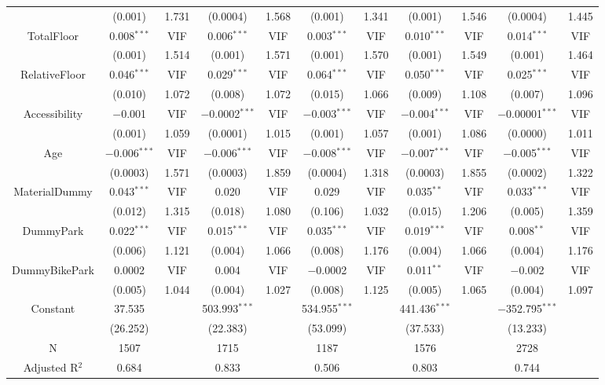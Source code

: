 \documentclass[a4paper, 12pt]{article} %
\begin{document}
\begin{landscape}
\begin{longtable}[c]{ccccccccccc}
& (0.001) & 1.731 & (0.0004) & 1.568 & (0.001) & 1.341 &  (0.001) & 1.546 & (0.0004) & 1.445 \\
\addlinespace[0.5em]
TotalFloor & 0.008$^{***}$ & VIF & 0.006$^{***}$ & VIF & 0.003$^{***}$ & VIF & 0.010$^{***}$ & VIF & 0.014$^{***}$ & VIF \\
& (0.001) & 1.514 & (0.001) & 1.571 & (0.001) & 1.570 & (0.001) & 1.549 & (0.001) & 1.464 \\
\addlinespace[0.5em]
RelativeFloor & 0.046$^{***}$ & VIF & 0.029$^{***}$ & VIF & 0.064$^{***}$ & VIF & 0.050$^{***}$ & VIF & 0.025$^{***}$ & VIF \\
& (0.010) & 1.072 & (0.008) & 1.072 & (0.015) & 1.066 & (0.009) & 1.108 & (0.007) & 1.096 \\
\addlinespace[0.5em]
Accessibility & $-$0.001 & VIF & $-$0.0002$^{***}$ & VIF & $-$0.003$^{***}$ & VIF & $-$0.004$^{***}$ & VIF & $-$0.00001$^{***}$ & VIF \\
& (0.001) & 1.059 & (0.0001) & 1.015 & (0.001) & 1.057 & (0.001) & 1.086 & (0.0000) & 1.011 \\
\addlinespace[0.5em]
Age & $-$0.006$^{***}$ & VIF & $-$0.006$^{***}$ & VIF & $-$0.008$^{***}$ & VIF & $-$0.007$^{***}$ & VIF & $-$0.005$^{***}$ & VIF \\
& (0.0003) & 1.571 & (0.0003) & 1.859 & (0.0004) & 1.318 & (0.0003) & 1.855 & (0.0002) & 1.322 \\
\addlinespace[0.5em]
MaterialDummy & 0.043$^{***}$ & VIF & 0.020 & VIF & 0.029 & VIF & 0.035$^{**}$ & VIF & 0.033$^{***}$ & VIF \\
& (0.012) & 1.315 & (0.018) & 1.080 & (0.106) & 1.032 & (0.015) & 1.206 & (0.005) & 1.359 \\
\addlinespace[0.5em]
DummyPark & 0.022$^{***}$ & VIF & 0.015$^{***}$ & VIF & 0.035$^{***}$ & VIF & 0.019$^{***}$ & VIF & 0.008$^{**}$ & VIF \\
& (0.006) & 1.121 & (0.004) & 1.066 & (0.008) & 1.176 & (0.004) & 1.066 & (0.004) & 1.176 \\
\addlinespace[0.5em]
DummyBikePark & 0.0002 & VIF & 0.004 & VIF & $-$0.0002 & VIF & 0.011$^{**}$ & VIF & $-$0.002 & VIF \\
& (0.005) & 1.044 & (0.004) & 1.027 & (0.008) & 1.125 & (0.005) & 1.065 & (0.004) & 1.097 \\
\addlinespace[0.5em]
Constant & 37.535 & & 503.993$^{***}$ & & 534.955$^{***}$ & & 441.436$^{***}$ & & $-$352.795$^{***}$ & \\
& (26.252) & & (22.383) & & (53.099) & & (37.533) & & (13.233) & \\
\hline
N & 1507 & & 1715 & & 1187 & & 1576 & & 2728 & \\
Adjusted R$^2$ & 0.684 & & 0.833 & & 0.506 & & 0.803 & & 0.744 & \\
\end{longtable}

\end{landscape}
\clearpage
\end{document}
